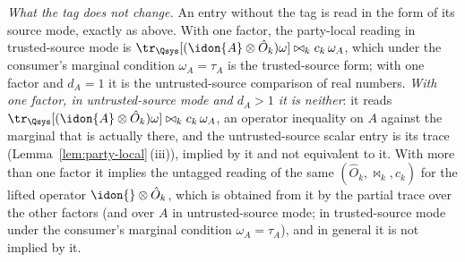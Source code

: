 \begin{definition}
\emph{What the tag does not change.} An entry without the tag is read in
the form of its source mode, exactly as above. With one factor, the
party-local reading in trusted-source mode is
$\tr_{\Qsys}[(\idon{A}\otimes\hat O_k)\omega]\bowtie_kc_k\,\omega_A$, which
under the consumer's marginal condition $\omega_A=\tau_A$ is the
trusted-source form; with one factor and $d_A=1$ it is the untrusted-source
comparison of real numbers. \emph{With one factor, in untrusted-source mode
and $d_A>1$ it is neither}: it reads
$\tr_{\Qsys}[(\idon{A}\otimes\hat O_k)\omega]\bowtie_kc_k\,\omega_A$, an
operator inequality on $A$ against the marginal that is actually there, and
the untrusted-source scalar entry is its trace
(Lemma~\ref{lem:party-local}\,(iii)), implied by it and not equivalent to
it. With more than one factor it implies the untagged reading of the same
$(\hat O_k,\bowtie_k,c_k)$ for the lifted operator $\idon{}\otimes\hat O_k$,
which is obtained from it by the partial trace over the other factors (and
over $A$ in untrusted-source mode; in trusted-source mode under the
consumer's marginal condition $\omega_A=\tau_A$), and in general it is not
implied by it.
\end{definition}
